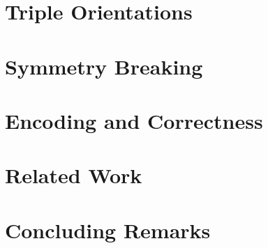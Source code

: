 \documentclass[a4paper, USenglish, cleveref, autoref, thm-restate]{lipics-v2021}
\begin{document}
\section{Triple Orientations}\label{sec:triple-orientations}


% 

\section{Symmetry Breaking}\label{sec:symmetry-breaking}

\section{Encoding and Correctness}\label{sec:encoding}


% 

\section{Related Work}\label{sec:related-work}


\section{Concluding Remarks}\label{sec:conclusions}



\end{document}

